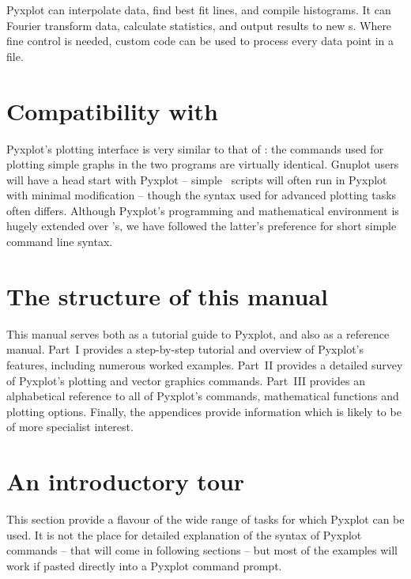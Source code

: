 
Pyxplot can interpolate data, find best fit lines, and compile histograms. It
can Fourier transform data, calculate statistics, and output results to new
\datafile s. Where fine control is needed, custom code can be used to process
every data point in a file.

\section{Compatibility with \gnuplot}

Pyxplot's plotting interface is very similar to that of \gnuplot: the commands
used for plotting simple graphs in the two programs are virtually identical.
Gnuplot users will have a head start with Pyxplot -- simple \gnuplot\ scripts
will often run in Pyxplot with minimal modification -- though the syntax used
for advanced plotting tasks often differs. Although Pyxplot's programming and
mathematical environment is hugely extended over \gnuplot's, we have followed
the latter's preference for short simple command line syntax.

\section{The structure of this manual}

This manual serves both as a tutorial guide to Pyxplot, and also as a reference
manual. Part~I provides a step-by-step tutorial and overview of Pyxplot's
features, including numerous worked examples. Part~II provides a detailed
survey of Pyxplot's plotting and vector graphics commands. Part~III provides an
alphabetical reference to all of Pyxplot's commands, mathematical functions and
plotting options.  Finally, the appendices provide information which is likely
to be of more specialist interest.

\section{An introductory tour}

This section provide a flavour of the wide range of tasks for which Pyxplot can
be used. It is not the place for detailed explanation of the syntax of Pyxplot
commands -- that will come in following sections -- but most of the examples
will work if pasted directly into a Pyxplot command prompt.


